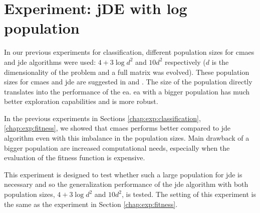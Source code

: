 \documentclass[12pt,a4paper]{report}
\begin{document}

\section{Experiment: jDE with log population} \label{chap:exp:logjde}
In our previous experiments for classification, different population sizes for \ac{cmaes} and \ac{jde} algorithms were used: $4+3\log{d^2}$ and $10d^2$ respectively ($d$ is the dimensionality of the problem and a full matrix was evolved). These population sizes for \ac{cmaes} and \ac{jde} are suggested in \citep{hansen2001completely} and \citep{brest2006self}. The size of the population directly translates into the performance of the \acl{ea}. \ac{ea} with a bigger population has much better exploration capabilities and is more robust.

In the previous experiments in Sections \ref{chap:exp:classification}, \ref{chap:exp:fitness}, we showed that \ac{cmaes} performs better compared to \ac{jde} algorithm \citep{fukui2013evolutionary} even with this imbalance in the population sizes. Main drawback of a bigger population are increased computational needs, especially when the evaluation of the fitness function is expensive.

This experiment is designed to test whether such a large population for \ac{jde} is necessary and so the generalization performance of the \ac{jde} algorithm with both population sizes, $4+3\log{d^2}$ and $10d^2$, is tested. The setting of this experiment is the same as the experiment in Section \ref{chap:exp:fitness}.
\end{document}
